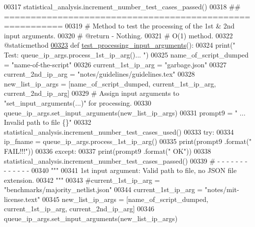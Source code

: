 \begin{DoxyCode}
00317             statistical\_analysis.increment\_number\_test\_cases\_passed()
00318     \textcolor{comment}{## =========================================================}
00319     \textcolor{comment}{#   Method to test the processing of the 1st & 2nd input arguments.}
00320     \textcolor{comment}{#   @return - Nothing.}
00321     \textcolor{comment}{#   O(1) method.}
00322     @staticmethod
\hypertarget{queue__ip__arguments__tester_8py_source_l00323}{}\hyperlink{classutilities_1_1queue__ip__arguments__tester_1_1queue__ip__args__tester_a53e53ec2797918a6488b0d75ba437407}{00323}     \textcolor{keyword}{def }\hyperlink{classutilities_1_1queue__ip__arguments__tester_1_1queue__ip__args__tester_a53e53ec2797918a6488b0d75ba437407}{test\_processing\_input\_arguments}():
00324         print(\textcolor{stringliteral}{" Test: queue\_ip\_args.process\_1st\_ip\_arg()... "})
00325         name\_of\_script\_dumped = \textcolor{stringliteral}{"name-of-the-script"}
00326         current\_1st\_ip\_arg = \textcolor{stringliteral}{"garbage.json"}
00327         current\_2nd\_ip\_arg = \textcolor{stringliteral}{"notes/guidelines/guidelines.tex"}
00328         new\_list\_ip\_args = [name\_of\_script\_dumped, current\_1st\_ip\_arg, current\_2nd\_ip\_arg]
00329         \textcolor{comment}{#   Assign input arguments to "set\_input\_arguments(...)" for processing.}
00330         queue\_ip\_args.set\_input\_arguments(new\_list\_ip\_args)
00331         prompt9 = \textcolor{stringliteral}{" ... Invalid path to file    \{\}"}
00332         statistical\_analysis.increment\_number\_test\_cases\_used()
00333         \textcolor{keywordflow}{try}:
00334             ip\_fname = queue\_ip\_args.process\_1st\_ip\_arg()
00335             print(prompt9 .format(\textcolor{stringliteral}{"     FAIL!!!"}))
00336         \textcolor{keywordflow}{except}:
00337             print(prompt9 .format(\textcolor{stringliteral}{"         OK"}))
00338             statistical\_analysis.increment\_number\_test\_cases\_passed()
00339         \textcolor{comment}{#   -   -   -   -   -   -   -   -   -   -   -   -   -}
00340         \textcolor{stringliteral}{"""}
00341 \textcolor{stringliteral}{            1st input argument: Valid path to file, no JSON file extension.}
00342 \textcolor{stringliteral}{        """}
00343         \textcolor{comment}{#current\_1st\_ip\_arg = "benchmarks/majority\_netlist.json"}
00344         current\_1st\_ip\_arg = \textcolor{stringliteral}{"notes/mit-license.text"}
00345         new\_list\_ip\_args = [name\_of\_script\_dumped, current\_1st\_ip\_arg, current\_2nd\_ip\_arg]
00346         queue\_ip\_args.set\_input\_arguments(new\_list\_ip\_args)

\end{DoxyCode}
